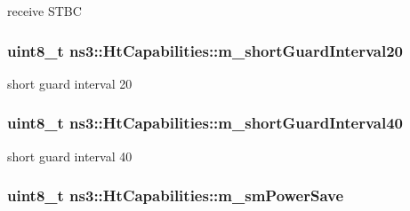 receive S\+T\+BC 

\subsubsection[{\texorpdfstring{m\+\_\+short\+Guard\+Interval20}{m_shortGuardInterval20}}]{\setlength{\rightskip}{0pt plus 5cm}uint8\+\_\+t ns3\+::\+Ht\+Capabilities\+::m\+\_\+short\+Guard\+Interval20\hspace{0.3cm}{\ttfamily [private]}}\hypertarget{classns3_1_1HtCapabilities_a0b88558f1d05ee4d787a57469ffcf91c}{}\label{classns3_1_1HtCapabilities_a0b88558f1d05ee4d787a57469ffcf91c}


short guard interval 20 

\subsubsection[{\texorpdfstring{m\+\_\+short\+Guard\+Interval40}{m_shortGuardInterval40}}]{\setlength{\rightskip}{0pt plus 5cm}uint8\+\_\+t ns3\+::\+Ht\+Capabilities\+::m\+\_\+short\+Guard\+Interval40\hspace{0.3cm}{\ttfamily [private]}}\hypertarget{classns3_1_1HtCapabilities_a083eba0f7135149f8aeb1b1c728395fb}{}\label{classns3_1_1HtCapabilities_a083eba0f7135149f8aeb1b1c728395fb}


short guard interval 40 

\subsubsection[{\texorpdfstring{m\+\_\+sm\+Power\+Save}{m_smPowerSave}}]{\setlength{\rightskip}{0pt plus 5cm}uint8\+\_\+t ns3\+::\+Ht\+Capabilities\+::m\+\_\+sm\+Power\+Save\hspace{0.3cm}{\ttfamily [private]}}\hypertarget{classns3_1_1HtCapabilities_affda9514f4896c315174a659b00aed6a}{}\label{classns3_1_1HtCapabilities_affda9514f4896c315174a659b00aed6a}


